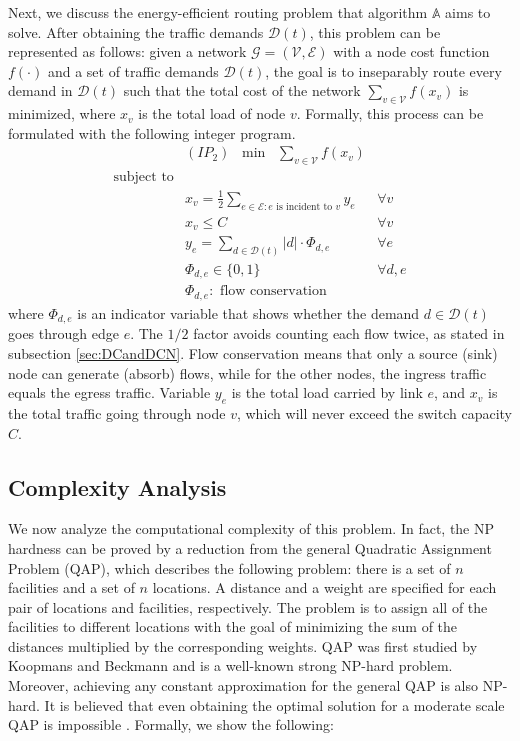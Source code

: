 \documentclass[journal,single-space,two column,twoside,10pt]{IEEEtran}
\begin{document}
Next, we discuss the energy-efficient routing problem that algorithm $\mathbb{A}$ aims to solve. After obtaining the traffic demands $\mathcal{D}(t)$, this problem can be represented as follows: given a network $\mathcal{G}=(\mathcal{V},\mathcal{E})$ with a node cost function $f(\cdot)$ and a set of traffic demands $\mathcal{D}(t)$, the goal is to inseparably route every demand in $\mathcal{D}(t)$ such that the total cost of the network $\sum_{v \in \mathcal{V}} f(x_v)$ is minimized, where $x_v$ is the total load of node $v$. Formally, this process can be formulated with the following integer program.
\begin{equation}
	\begin{array}{lll}
		& (IP_2) \;\; \min \;\; \sum_{v \in \mathcal{V}} f(x_v) \nonumber\\
		\mbox{subject to} \nonumber \\
		& x_v = \frac{1}{2} \sum_{e \in \mathcal{E}: e \text{ is incident to } v}y_e & \forall v \nonumber\\
		& x_v \leq C & \forall v \\
		& y_e = \sum_{d \in \mathcal{D}(t)} |d| \cdot \Phi_{d,e} &  \forall e \nonumber\\
		& \Phi_{d,e} \in \{0,1\} &  \forall d,e \nonumber\\
		& \Phi_{d,e}: \mbox{ flow conservation}\nonumber
	\end{array}
	\nonumber
\end{equation}
where $\Phi_{d,e}$ is an indicator variable that shows whether the demand $d \in \mathcal{D}(t)$ goes through edge $e$. The $1/2$ factor avoids counting each flow twice, as stated in subsection \ref{sec:DCandDCN}. Flow conservation means that only a source (sink) node can generate (absorb) flows, while for the other nodes, the ingress traffic equals the egress traffic. Variable $y_e$ is the total load carried by link $e$, and $x_v$ is the total traffic going through node $v$, which will never exceed the switch capacity $C$.



\subsection{Complexity Analysis}

We now analyze the computational complexity of this problem. In fact, the NP hardness can be proved by a reduction from the general Quadratic Assignment Problem (QAP), which describes the following problem: there is a set of $n$ facilities and a set of $n$ locations. A distance and a weight are specified for each pair of locations and facilities, respectively. The problem is to assign all of the facilities to different locations with the goal of minimizing the sum of the distances multiplied by the corresponding weights. QAP was first studied by Koopmans and Beckmann \cite{Koopmans_Beckmann-1957} and is a well-known strong NP-hard problem. Moreover, achieving any constant approximation for the general QAP is also NP-hard. It is believed that even obtaining the optimal solution for a moderate scale QAP is impossible \cite{Meng_Pappas-2010}. Formally, we show the following:
\end{document}
